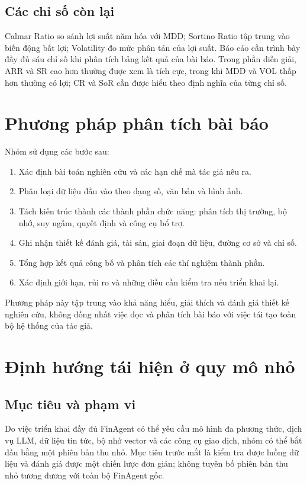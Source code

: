 \subsection{Các chỉ số còn lại}
Calmar Ratio so sánh lợi suất năm hóa với MDD; Sortino Ratio tập trung vào biến động bất lợi; Volatility đo mức phân tán của lợi suất. Báo cáo cần trình bày đầy đủ sáu chỉ số khi phân tích bảng kết quả của bài báo. Trong phần diễn giải, ARR và SR cao hơn thường được xem là tích cực, trong khi MDD và VOL thấp hơn thường có lợi; CR và SoR cần được hiểu theo định nghĩa của từng chỉ số.

\section{Phương pháp phân tích bài báo}

Nhóm sử dụng các bước sau:
\begin{enumerate}
    \item Xác định bài toán nghiên cứu và các hạn chế mà tác giả nêu ra.
    \item Phân loại dữ liệu đầu vào theo dạng số, văn bản và hình ảnh.
    \item Tách kiến trúc thành các thành phần chức năng: phân tích thị trường, bộ nhớ, suy ngẫm, quyết định và công cụ bổ trợ.
    \item Ghi nhận thiết kế đánh giá, tài sản, giai đoạn dữ liệu, đường cơ sở và chỉ số.
    \item Tổng hợp kết quả công bố và phân tích các thí nghiệm thành phần.
    \item Xác định giới hạn, rủi ro và những điều cần kiểm tra nếu triển khai lại.
\end{enumerate}
Phương pháp này tập trung vào khả năng hiểu, giải thích và đánh giá thiết kế nghiên cứu, không đồng nhất việc đọc và phân tích bài báo với việc tái tạo toàn bộ hệ thống của tác giả.

\section{Định hướng tái hiện ở quy mô nhỏ}

\subsection{Mục tiêu và phạm vi}
Do việc triển khai đầy đủ FinAgent có thể yêu cầu mô hình đa phương thức, dịch vụ LLM, dữ liệu tin tức, bộ nhớ vector và các công cụ giao dịch, nhóm có thể bắt đầu bằng một phiên bản thu nhỏ. Mục tiêu trước mắt là kiểm tra được luồng dữ liệu và đánh giá được một chiến lược đơn giản; không tuyên bố phiên bản thu nhỏ tương đương với toàn bộ FinAgent gốc.

